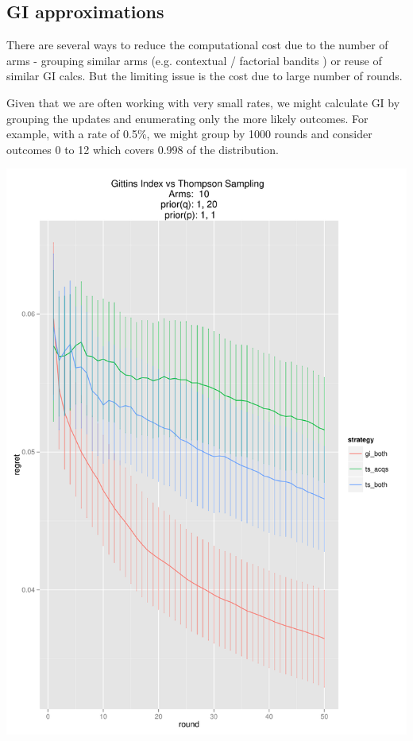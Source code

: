 \documentclass[11pt,a4,singlespacing,titlepagenumber=on]{scrreprt}
\numberwithin{equation}{chapter} %
\theoremstyle{remark}
\begin{document}
\subsection{GI approximations}

There are several ways to reduce the computational cost due to the number of arms - grouping similar arms (e.g. contextual / factorial bandits ) or reuse of similar GI calcs. But the limiting issue is the cost due to large number of rounds.

Given that we are often working with very small rates, we might calculate GI by grouping the updates and enumerating only the more likely outcomes. For example, with a rate of 0.5\%, we might group by 1000 rounds and consider outcomes 0 to 12 which covers 0.998 of the distribution. 


\includegraphics[scale=0.7]{GIBoth.pdf}
\end{document}

